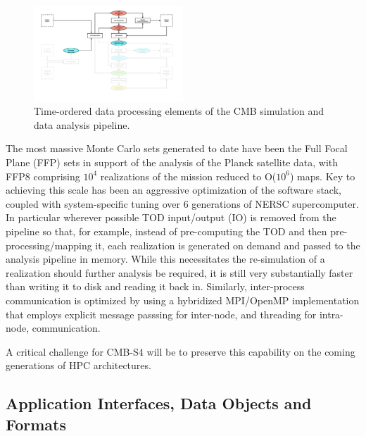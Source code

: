 \begin{figure}[htbp]
\centering
\includegraphics[width=0.5\textwidth]{Analysis/all_tod}
\caption{Time-ordered data processing elements of the CMB simulation and data analysis pipeline.}
\label{fig_all_tod}
\end{figure}

The most massive Monte Carlo sets generated to date have been the Full Focal Plane (FFP) sets in support of the analysis of the Planck satellite data, with FFP8 comprising $10^4$ realizations of the mission reduced to O($10^6$) maps. Key to achieving this scale has been an aggressive optimization of the software stack, coupled with system-specific tuning over 6 generations of NERSC supercomputer. In particular wherever possible TOD input/output (IO) is removed from the pipeline so that, for example, instead of pre-computing the TOD and then pre-processing/mapping it, each realization is generated on demand and passed to the analysis pipeline in memory. While this necessitates the re-simulation of a realization should further analysis be required, it is still very substantially faster than writing it to disk and reading it back in. Similarly, inter-process communication is optimized by using a hybridized MPI/OpenMP implementation that employs explicit message passsing for inter-node, and threading for intra-node, communication.

A critical challenge for CMB-S4 will be to preserve this capability on the coming generations of HPC architectures. 


\subsection{Application Interfaces, Data Objects and Formats}

%



